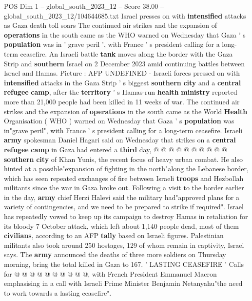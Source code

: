 \begin{textsample}{POS Dim 1 – global\_south\_2023\_12 – Score 38.00 – global\_south\_2023\_12/104644685.txt}  \label{ex:f1_pos_032}
Israel presses on with \textbf{intensified} attacks as Gaza death toll soars The continued air strikes and the expansion of \textbf{operations} in the south came as the WHO warned on Wednesday that Gaza ' s \textbf{population} was in ' grave peril ', with France ' s president calling for a long-term ceasefire.
An Israeli battle \textbf{tank} moves along the border with the Gaza Strip and \textbf{southern} Israel on 2 December 2023 amid continuing battles between Israel and Hamas.
Picture : AFP UNDEFINED - Israeli forces pressed on with \textbf{intensified} attacks in the Gaza Strip ' s biggest \textbf{southern} \textbf{city} and a \textbf{central} \textbf{refugee} \textbf{camp}, after the \textbf{territory} ' s Hamas-run \textbf{health} \textbf{ministry} reported more than 21,000 people had been killed in 11 weeks of war.
The continued air strikes and the expansion of \textbf{operations} in the south came as the World \textbf{Health} Organisation ( WHO ) warned on Wednesday that Gaza ' s \textbf{population} was in"grave peril", with France ' s president calling for a long-term ceasefire.
Israeli \textbf{army} spokesman Daniel Hagari said on Wednesday that strikes on a \textbf{central} \textbf{refugee} \textbf{camp} in Gaza had entered a \textbf{third} day, @ @ @ @ @ @ @ @ @ @ \textbf{southern} \textbf{city} of Khan Yunis, the recent focus of heavy urban combat.
He also hinted at a possible"expansion of fighting in the north"along the Lebanese border, which has seen repeated exchanges of fire between Israeli \textbf{troops} and Hezbollah militants since the war in Gaza broke out.
Following a visit to the border earlier in the day, \textbf{army} chief Herzi Halevi said the military had"approved plans for a variety of contingencies, and we need to be prepared to strike if required".
Israel has repeatedly vowed to keep up its campaign to destroy Hamas in retaliation for its bloody 7 October attack, which left about 1,140 people dead, most of them \textbf{civilians}, according to an AFP \textbf{tally} based on Israeli figures.
Palestinian militants also took around 250 hostages, 129 of whom remain in captivity, Israel says.
The \textbf{army} announced the deaths of three more soldiers on Thursday morning, bring the total killed in Gaza to 167. ' LASTING CEASEFIRE ' Calls for @ @ @ @ @ @ @ @ @ @, with French President Emmanuel Macron emphasising in a call with Israeli Prime Minister Benjamin Netanyahu"the need to work towards a lasting ceasefire".

\end{textsample}
